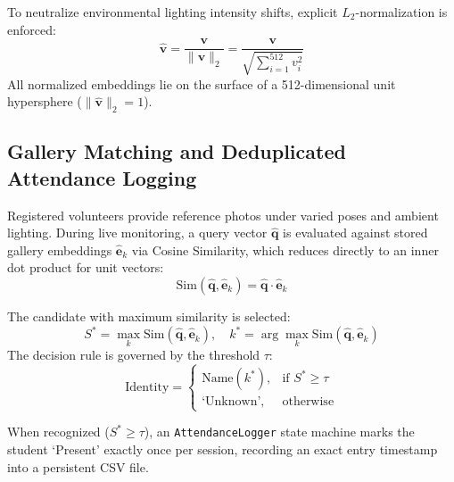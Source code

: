 \documentclass[conference]{IEEEtran}
\begin{document}
To neutralize environmental lighting intensity shifts, explicit $L_2$-normalization is enforced:
\begin{equation}
\mathbf{\hat{v}} = \frac{\mathbf{v}}{\|\mathbf{v}\|_2} = \frac{\mathbf{v}}{\sqrt{\sum_{i=1}^{512} v_i^2}}
\label{eq:l2norm}
\end{equation}
All normalized embeddings lie on the surface of a 512-dimensional unit hypersphere ($\|\mathbf{\hat{v}}\|_2 = 1$).

\subsection{Gallery Matching and Deduplicated Attendance Logging}
Registered volunteers provide reference photos under varied poses and ambient lighting. During live monitoring, a query vector $\mathbf{\hat{q}}$ is evaluated against stored gallery embeddings $\mathbf{\hat{e}}_k$ via Cosine Similarity, which reduces directly to an inner dot product for unit vectors:
\begin{equation}
\text{Sim}(\mathbf{\hat{q}}, \mathbf{\hat{e}}_k) = \mathbf{\hat{q}} \cdot \mathbf{\hat{e}}_k
\label{eq:cossim}
\end{equation}

The candidate with maximum similarity is selected:
\begin{equation}
S^* = \max_{k} \text{Sim}(\mathbf{\hat{q}}, \mathbf{\hat{e}}_k), \quad k^* = \arg\max_{k} \text{Sim}(\mathbf{\hat{q}}, \mathbf{\hat{e}}_k)
\end{equation}
The decision rule is governed by the threshold $\tau$:
\begin{equation}
\text{Identity} = 
\begin{cases} 
\text{Name}(k^*), & \text{if } S^* \ge \tau \\ 
\text{`Unknown'}, & \text{otherwise} 
\end{cases}
\end{equation}

When recognized ($S^* \ge \tau$), an \texttt{AttendanceLogger} state machine marks the student `Present' exactly once per session, recording an exact entry timestamp into a persistent CSV file.
\end{document}
